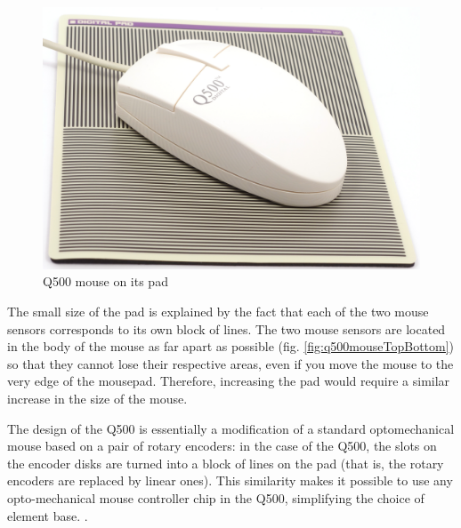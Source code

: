 \documentclass[11pt, a4paper]{article}
\begin{document}
\begin{figure}[h]
    \centering
    \includegraphics[scale=0.4]{1996_q500_mouse/pad_30.jpg}
    \caption{Q500 mouse on its pad}
    \label{fig:q500mousePad}
\end{figure}

The small size of the pad is explained by the fact that each of the two mouse sensors corresponds to its own block of lines.
The two mouse sensors are located in the body of the mouse as far apart as possible (fig. \ref{fig:q500mouseTopBottom}) so that they cannot lose their respective areas, even if you move the mouse to the very edge of the mousepad. Therefore, increasing the pad would require a similar increase in the size of the mouse.

The design of the Q500 is essentially a modification of a standard optomechanical mouse based on a pair of rotary encoders: in the case of the Q500, the slots on the encoder disks are turned into a block of lines on the pad (that is, the rotary encoders are replaced by linear ones). This similarity makes it possible to use any opto-mechanical mouse controller chip in the Q500, simplifying the choice of element base. \cite{yq}.
\end{document}
